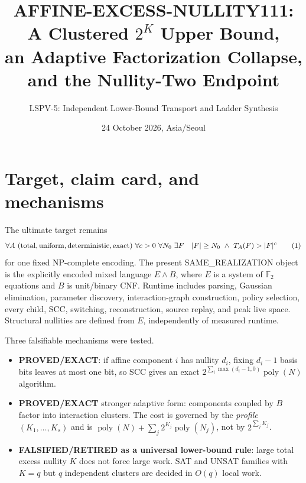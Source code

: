 \documentclass[11pt]{article}
\title{AFFINE-EXCESS-NULLITY111: A Clustered $2^K$ Upper Bound,\\
an Adaptive Factorization Collapse, and the Nullity-Two Endpoint}
\author{LSPV-5: Independent Lower-Bound Transport and Ladder Synthesis}
\date{24 October 2026, Asia/Seoul}
\newcommand{\poly}{\operatorname{poly}}
\newcommand{\PROVED}{\textbf{PROVED/EXACT}}
\begin{document}
\maketitle
\begin{center}
\end{center}

\section{Target, claim card, and mechanisms}
The ultimate target remains
\[
\forall A\ {\rm(total,uniform,deterministic,exact)}\ \forall c>0\ \forall N_0\
\exists F\quad |F|\ge N_0\ \land\ T_A(F)>|F|^c                       \tag{1}
\]
for one fixed NP-complete encoding.  The present SAME\_REALIZATION object is
the explicitly encoded mixed language $E\wedge B$, where $E$ is a system of
$\mathbb F_2$ equations and $B$ is unit/binary CNF.  Runtime includes parsing,
Gaussian elimination, parameter discovery, interaction-graph construction,
policy selection, every child, SCC, switching, reconstruction, source replay,
and peak live space.  Structural nullities are defined from $E$, independently
of measured runtime.

Three falsifiable mechanisms were tested.
\begin{itemize}
\item \PROVED{}: if affine component $i$ has nullity $d_i$, fixing
$d_i-1$ basis bits leaves at most one bit, so SCC gives an exact
$2^{\sum_i\max(d_i-1,0)}\poly(N)$ algorithm.
\item \PROVED{} stronger adaptive form: components coupled by $B$ factor into
interaction clusters.  The cost is governed by the \emph{profile}
$(K_1,\ldots,K_s)$ and is $\poly(N)+\sum_j2^{K_j}\poly(N_j)$, not by
$2^{\sum_jK_j}$.
\item \textbf{FALSIFIED/RETIRED as a universal lower-bound rule}: large total
excess nullity $K$ does not force large work.  SAT and UNSAT families with
$K=q$ but $q$ independent clusters are decided in $O(q)$ local work.
\end{itemize}
\end{document}
